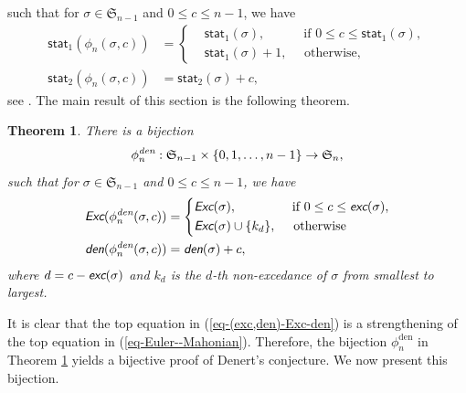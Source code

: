 \documentclass[12pt]{article}
\newtheorem{theorem}{Theorem}[section]
\begin{document}
\vspace{-10pt}
\noindent such that for $\sigma\in\mathfrak{S}_{n-1}$ and $0\leq c\leq n-1$, 
we have
\begin{equation}\label{eq-Euler--Mahonian}
	\begin{split}
		\textsf{stat}_{1}(\phi_{n}(\sigma,c))&=\left
		\{
		\begin{aligned}
			&\textsf{stat}_{1}(\sigma), \quad\quad\quad\text{if~}0\leq c\leq \textsf{stat}_{1}(\sigma),\\
			&\textsf{stat}_{1}(\sigma)+1,\quad\text{~otherwise,}
		\end{aligned}
		\right.\\				
		\textsf{stat}_{2}(\phi_{n}(\sigma,c))&=\textsf{stat}_{2}(\sigma)+c, 
	\end{split}
\end{equation}
see \cite{Rawlings-1981,Han-1990-direct}. 
The main result of this section is the following theorem.
\begin{theorem}\label{Thm-New-bijection}
	There is a bijection $$\phi_{n}^{\emph{\text{den}}}: \mathfrak{S}_{n-1}\times\{0,1,\ldots,n-1\}\rightarrow\mathfrak{S}_{n},$$
	such that for $\sigma\in\mathfrak{S}_{n-1}$ and $0\leq c\leq n-1$, 
	we have 
\begin{equation}\label{eq-(exc,den)-Exc-den}
	\begin{split}
	\emph{\textsf{Exc}}(\phi_{n}^{\emph{\text{den}}}(\sigma,c))&=
	\left\{
	\begin{aligned}
		&\emph{\textsf{Exc}}(\sigma), \quad\quad\quad\quad~\text{if~}0\leq c\leq \emph{\textsf{exc}}(\sigma),\\
		&\emph{\textsf{Exc}}(\sigma)\cup\{k_{d}\},\quad\text{~otherwise}
	\end{aligned}
	\right.\\
	\emph{\textsf{den}}(\phi_{n}^{\emph{\text{den}}}(\sigma,c))&=\emph{\textsf{den}}(\sigma)+c,
		\end{split}
\end{equation}
where $d=c-\emph{\textsf{exc}}(\sigma)$ and
$k_{d}$ is the $d$-th non-excedance of $\sigma$ from smallest to largest.
\end{theorem}
It is clear that the top equation in (\ref{eq-(exc,den)-Exc-den}) is a strengthening of the top equation in (\ref{eq-Euler--Mahonian}).
Therefore, the bijection $\phi_{n}^{\text{den}}$ in Theorem \ref{Thm-New-bijection} yields a bijective proof of Denert's conjecture. 
We now present this bijection.

\vskip 2pt	
\end{document}
